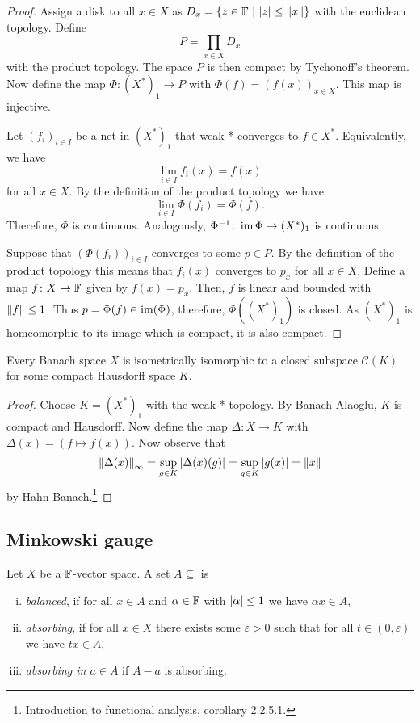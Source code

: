 \begin{proof}
Assign a disk to all $x \in X$ as
$D_x = \left\{z \in \mathbb{F}~\middle\vert~\left\lvert z\right\rvert \leq \left\lVert x\right\rVert\right\}$ with the euclidean
topology. Define
\[
P = \prod_{x \in X} D_x
\]
with the product topology. The space $P$ is then compact by
Tychonoff's theorem. Now define the map $\Phi \colon (X^*)_1 \to P$
with $\Phi(f) = (f(x))_{x \in X}$. This map is injective.

Let $(f_i)_{i \in I}$ be a net in $(X^*)_1$ that weak-* converges
to $f \in X^*$. Equivalently, we have
\[
\lim_{i \in I} f_i(x) = f(x)
\]
for all $x \in X$. By the definition of the product topology we
have
\[
\lim_{i \in I} \Phi(f_i) = \Phi(f).
\]
Therefore, $\Phi$ is continuous. Analogously,
$\Phi^{-1} \colon \operatorname{im} \Phi \to (X^*)_1$ is continuous.

Suppose that $(\Phi(f_i))_{i \in I}$ converges to some $p \in P$.
By the definition of the product topology this means that
$f_i(x)$ converges to $p_x$ for all $x \in X$. Define a map
$f \colon X \to \mathbb{F}$ given by $f(x) = p_x$. Then, $f$ is linear and
bounded with $\left\lVert f\right\rVert \leq 1$. Thus $p = \Phi(f) \in \operatorname{im}(\Phi)$,
therefore, $\Phi((X^*)_1)$ is closed. As $(X^*)_1$ is homeomorphic
to its image which is compact, it is also compact.
\end{proof}

\begin{posledica}
Every Banach space $X$ is isometrically isomorphic to a closed
subspace $\mathcal{C}(K)$ for some compact Hausdorff space $K$.
\end{posledica}

\begin{proof}
Choose $K = (X^*)_1$ with the weak-* topology. By Banach-Alaoglu,
$K$ is compact and Hausdorff. Now define the map
$\Delta \colon X \to K$ with $\Delta(x) = (f \mapsto f(x))$.
Now observe that
\[
\left\lVert \Delta(x)\right\rVert_\infty =
\sup_{g \in K} \left\lvert \Delta(x)(g)\right\rvert =
\sup_{g \in K} \left\lvert g(x)\right\rvert =
\left\lVert x\right\rVert
\]
by Hahn-Banach.\footnote{Introduction to functional analysis,
corollary 2.2.5.1.}
\end{proof}

\newpage

\subsection{Minkowski gauge}


\begin{definicija}
Let $X$ be a $\mathbb{F}$-vector space. A set $A \subseteq$ is

\begin{enumerate}[i)]
\item \emph{balanced}, if for all $x \in A$
and $\alpha \in \mathbb{F}$ with $\left\lvert \alpha\right\rvert \leq 1$ we have
$\alpha x \in A$,
\item \emph{absorbing}, if for all $x \in X$
there exists some $\varepsilon > 0$ such that for all
$t \in (0, \varepsilon)$ we have $tx \in A$,
\item \emph{absorbing in $a \in A$} if $A - a$ is absorbing.
\end{enumerate}
\end{definicija}

